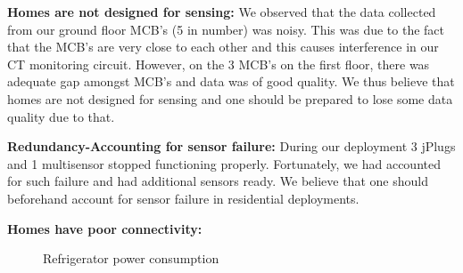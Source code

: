 \documentclass[10pt]{sensys-proc}
\begin{document}
\noindent \textbf{Homes are not designed for sensing:} We observed that the data collected from our ground floor MCB's (5 in number) was noisy. This was due to the fact that the MCB's are very close to each other and this causes interference in our CT monitoring circuit. However, on the 3 MCB's on the first floor, there was adequate gap amongst MCB's and data was of good quality. We thus believe that homes are not designed for sensing and one should be prepared to lose some data quality due to that.

\noindent \textbf{Redundancy-Accounting for sensor failure:} During our deployment 3 jPlugs and 1 multisensor stopped functioning properly. Fortunately, we had accounted for such failure and had additional sensors ready. We believe that one should beforehand  account for sensor failure in residential deployments.

\noindent \textbf{Homes have poor connectivity:} 

\begin{figure}
       
   
    \caption{Refrigerator power consumption}

    \label{fig:metadata}

\end{figure}
\end{document}
